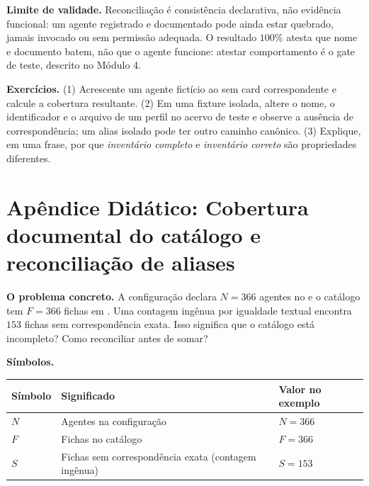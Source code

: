 \begin{aviso}
\textbf{Limite de validade.} Reconciliação é consistência declarativa, não evidência funcional: um agente registrado e documentado pode ainda estar quebrado, jamais invocado ou sem permissão adequada. O resultado $100\%$ atesta que nome e documento batem, não que o agente funcione: atestar comportamento é o gate de teste, descrito no Módulo 4.
\end{aviso}

\begin{resultado}
\textbf{Exercícios.} (1) Acrescente um agente fictício ao  sem card correspondente e calcule a cobertura resultante. (2) Em uma fixture isolada, altere o nome, o identificador e o arquivo de um perfil no acervo de teste e observe a ausência de correspondência; um alias isolado pode ter outro caminho canônico. (3) Explique, em uma frase, por que \emph{inventário completo} e \emph{inventário correto} são propriedades diferentes.
\end{resultado}

\clearpage
\section{Apêndice Didático: Cobertura documental do catálogo e reconciliação de aliases}


\begin{descricao}
\textbf{O problema concreto.} A configuração declara $N = 366$ agentes no  e o catálogo tem $F = 366$ fichas em . Uma contagem ingênua por igualdade textual encontra $153$ fichas sem correspondência exata. Isso significa que o catálogo está incompleto? Como reconciliar antes de somar?
\end{descricao}

\begin{definicao}
\textbf{Símbolos.}

\begin{center}
\begin{tabularx}{\linewidth}{YYY}
Símbolo & Significado & Valor no exemplo \\
\midrule
$N$ & Agentes na configuração & $N = 366$ \\
$F$ & Fichas no catálogo & $F = 366$ \\
$S$ & Fichas sem correspondência exata (contagem ingênua) & $S = 153$ \\
\end{tabularx}
\end{center}
\end{definicao}


